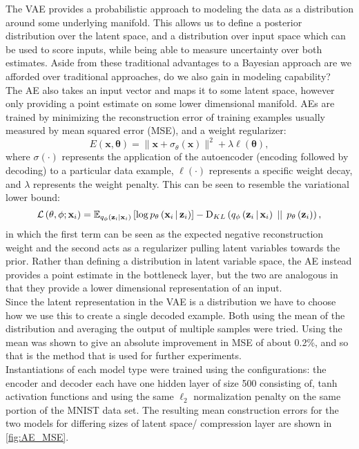 \documentclass[../report/report.tex]{subfiles}
\begin{document}
The VAE provides a probabilistic approach to modeling the data as a distribution around some underlying manifold. This allows us to define a posterior distribution over the latent space, and a distribution over input space which can be used to score inputs, while being able to measure uncertainty over both estimates. Aside from these traditional advantages to a Bayesian approach are we afforded over traditional approaches, do we also gain in modeling capability?\\
The AE also takes an input vector and maps it to some latent space, however only providing a point estimate on some lower dimensional manifold. AEs are trained by minimizing the reconstruction error of training examples usually measured by mean squared error (MSE), and a weight regularizer:
\begin{equation}
E(\mathbf{x, \theta}) = \lVert \mathbf{x} + \sigma_\theta(\mathbf{x})\rVert^2 + \lambda \ell(\mathbf{\theta}),
\end{equation}
where $\sigma(\cdot)$ represents the application of the autoencoder (encoding followed by decoding) to a particular data example, $\ell(\cdot)$ represents a specific weight decay, and $\lambda$ represents the weight penalty. This can be seen to resemble the variational lower bound:
\begin{equation}
\mathcal{L} \left( \mathbf{\theta}, \phi; \mathbf{x}_i\right)=\mathbb{E}_{q_\phi \left( \mathbf{z}_i|\mathbf{x}_i\right)} \left[ \log p_\mathbf{\theta} \left(\mathbf{x}_i \, \middle\vert \, \mathbf{z}_i \right) \right] - \textrm{D}_{KL} \left( q_\phi \left(\mathbf{z}_i \, \middle\vert \, \mathbf{x}_i \right) \, \mid \mid \, p_\mathbf{\theta} \left( \mathbf{z}_i\right)\right),
\end{equation}
in which the first term can be seen as the expected negative reconstruction weight and the second  acts as a regularizer pulling latent variables towards the prior. Rather than defining a distribution in latent variable space, the AE instead provides a point estimate in the bottleneck layer, but the two are analogous in that they provide a lower dimensional representation of an input.\\
Since the latent representation in the VAE is a distribution we have to choose how we use this to create a single decoded example. Both using the mean of the distribution and averaging the output of multiple samples were tried. Using the mean was shown to give an absolute improvement in MSE of about 0.2\%, and so that is the method that is used for further experiments.\\
Instantiations of each model type were trained using the configurations: the encoder and decoder each have one hidden layer of size 500 consisting of, tanh activation functions and using the same $\ell_2$ normalization penalty on the same portion of the MNIST data set. The resulting mean construction errors for the two models for differing sizes of latent space/ compression layer are shown in \cref{fig:AE_MSE}.
\end{document}
